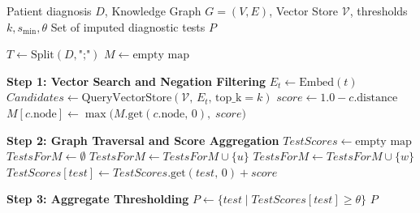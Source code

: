 \begin{algorithm}[htbp]
\caption{GraphRAG Semantic Retrieval and Score-Based Imputation}
\label{alg:semantic_imputation}
\begin{algorithmic}[1]
\Require Patient diagnosis $D$, Knowledge Graph $G=(V,E)$, Vector Store $\mathcal{V}$, thresholds $k, s_{\min}, \theta$
\Ensure Set of imputed diagnostic tests $P$

\State $T \gets \text{Split}(D, \texttt{";"})$ 
\State $M \gets \text{empty map}$ 

\State \textbf{Step 1: Vector Search and Negation Filtering}
    \State $E_t \gets \text{Embed}(t)$
    \State $\mathit{Candidates} \gets \text{QueryVectorStore}(\mathcal{V},\, E_t,\, \text{top\_k}=k)$
        \State $score \gets 1.0 - c.\text{distance}$ 
            \State $M[c.\text{node}] \gets \max\bigl(M.\text{get}(c.\text{node},\, 0),\; score\bigr)$
        \EndIf
    \EndFor
\EndFor

\State \textbf{Step 2: Graph Traversal and Score Aggregation}
\State $\mathit{TestScores} \gets \text{empty map}$
    \State $\mathit{TestsForM} \gets \emptyset$
            \State $\mathit{TestsForM} \gets \mathit{TestsForM} \cup \{u\}$
                    \State $\mathit{TestsForM} \gets \mathit{TestsForM} \cup \{w\}$
                \EndIf
            \EndFor
        \EndIf
    \EndFor
        \State $\mathit{TestScores}[test] \gets \mathit{TestScores}.\text{get}(test,\, 0) + score$
    \EndFor
\EndFor

\State \textbf{Step 3: Aggregate Thresholding}
\State $P \gets \{test \mid \mathit{TestScores}[test] \geq \theta\}$
\State \Return $P$
\end{algorithmic}
\end{algorithm}

\newpage

